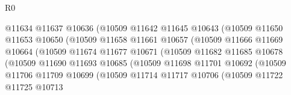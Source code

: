 \begin{lexlean}{R0}
\begin{coremodule}
                                      @11634
                                      @11637
                                      @10636
                                      (@10509
                                        @11642
                                        @11645
                                        @10643
                                        (@10509
                                          @11650
                                          @11653
                                          @10650
                                          (@10509
                                            @11658
                                            @11661
                                            @10657
                                            (@10509
                                              @11666
                                              @11669
                                              @10664
                                              (@10509
                                                @11674
                                                @11677
                                                @10671
                                                (@10509
                                                  @11682
                                                  @11685
                                                  @10678
                                                  (@10509
                                                    @11690
                                                    @11693
                                                    @10685
                                                    (@10509
                                                      @11698
                                                      @11701
                                                      @10692
                                                      (@10509
                                                        @11706
                                                        @11709
                                                        @10699
                                                        (@10509
                                                          @11714
                                                          @11717
                                                          @10706
                                                          (@10509
                                                            @11722
                                                            @11725
                                                            @10713

\end{coremodule}
\end{lexlean}
